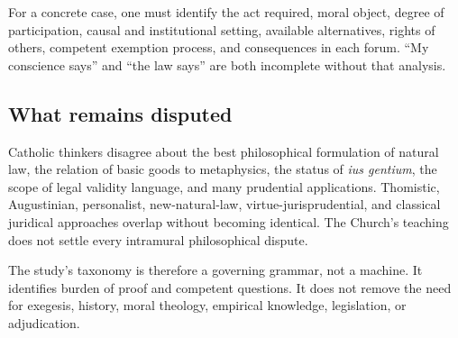 For a concrete case, one must identify the act required, moral object, degree of participation, causal and institutional setting, available alternatives, rights of others, competent exemption process, and consequences in each forum. ``My conscience says'' and ``the law says'' are both incomplete without that analysis.

\subsection{What remains disputed}

Catholic thinkers disagree about the best philosophical formulation of natural law, the relation of basic goods to metaphysics, the status of \emph{ius gentium}, the scope of legal validity language, and many prudential applications. Thomistic, Augustinian, personalist, new-natural-law, virtue-jurisprudential, and classical juridical approaches overlap without becoming identical. The Church's teaching does not settle every intramural philosophical dispute.

The study's taxonomy is therefore a governing grammar, not a machine. It identifies burden of proof and competent questions. It does not remove the need for exegesis, history, moral theology, empirical knowledge, legislation, or adjudication.
